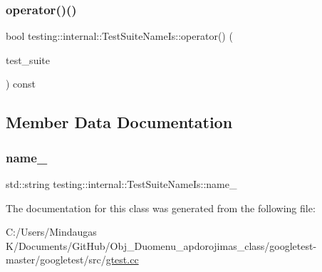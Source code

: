 \mbox{\label{classtesting_1_1internal_1_1_test_suite_name_is_a28ea67af3de2c5baf0fb70bfdd0784c6}} 
\subsubsection{\texorpdfstring{operator()()}{operator()()}\hspace{0.1cm}{\footnotesize\ttfamily [2/2]}}
{\footnotesize\ttfamily bool testing\+::internal\+::\+Test\+Suite\+Name\+Is\+::operator() (\begin{DoxyParamCaption}\item[{const \mbox{\hyperlink{classtesting_1_1_test_suite}{Test\+Suite}} $\ast$}]{test\+\_\+suite }\end{DoxyParamCaption}) const\hspace{0.3cm}{\ttfamily [inline]}}



\subsection{Member Data Documentation}
\mbox{\label{classtesting_1_1internal_1_1_test_suite_name_is_a55f64598a1bf6a95a376d732075e412e}} 
\subsubsection{\texorpdfstring{name\_}{name\_}}
{\footnotesize\ttfamily std\+::string testing\+::internal\+::\+Test\+Suite\+Name\+Is\+::name\+\_\+\hspace{0.3cm}{\ttfamily [private]}}



The documentation for this class was generated from the following file\+:\begin{DoxyCompactItemize}
\item 
C\+:/\+Users/\+Mindaugas K/\+Documents/\+Git\+Hub/\+Obj\+\_\+\+Duomenu\+\_\+apdorojimas\+\_\+class/googletest-\/master/googletest/src/\mbox{\hyperlink{googletest-master_2googletest_2src_2gtest_8cc}{gtest.\+cc}}\end{DoxyCompactItemize}
